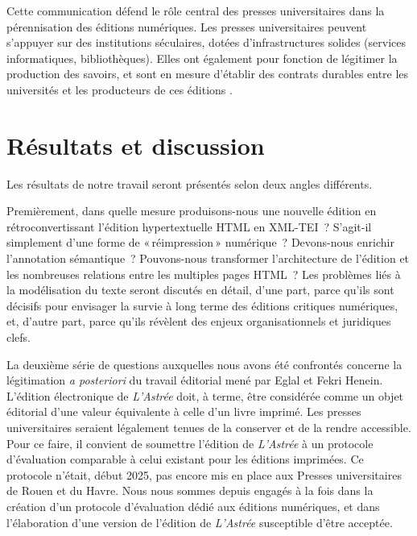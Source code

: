 \documentclass[final,fra]{anthology-ch} %
\begin{document}
Cette communication défend le rôle central des presses universitaires
dans la pérennisation des éditions numériques. Les presses universitaires
peuvent s'appuyer sur des institutions séculaires, dotées
d'infrastructures solides (services informatiques, bibliothèques). Elles
ont également pour fonction de légitimer la production des savoirs, et
sont en mesure d'établir des contrats durables entre les universités et
les producteurs de ces éditions \autocite{epron_iii_2018}.

\section{Résultats et discussion}\label{ruxe9sultats-et-discussion}

Les résultats de notre travail seront présentés selon deux angles
différents.

Premièrement, dans quelle mesure produisons-nous une nouvelle édition en
rétroconvertissant l'édition hypertextuelle HTML en XML-TEI~? S'agit-il
simplement d'une forme de «\,réimpression\,» numérique~? Devons-nous
enrichir l'annotation sémantique~? Pouvons-nous transformer
l'architecture de l'édition et les nombreuses relations entre les
multiples pages HTML~? Les problèmes liés à la modélisation du texte
seront discutés en détail, d'une part, parce qu'ils sont décisifs pour
envisager la survie à long terme des éditions critiques numériques, et,
d'autre part, parce qu'ils révèlent des enjeux organisationnels et
juridiques clefs.

La deuxième série de questions auxquelles nous avons été confrontés
concerne la légitimation \emph{a posteriori} du travail éditorial mené
par Eglal et Fekri Henein. L'édition électronique de \emph{L'Astrée}
doit, à terme, être considérée comme un objet éditorial d'une valeur
équivalente à celle d'un livre imprimé. Les presses universitaires
seraient légalement tenues de la conserver et de la rendre accessible.
Pour ce faire, il convient de soumettre l'édition de \emph{L'Astrée} à
un protocole d'évaluation comparable à celui existant pour les éditions
imprimées. Ce protocole n'était, début 2025, pas encore mis en place aux
Presses universitaires de Rouen et du Havre. Nous nous sommes depuis
engagés à la fois dans la création d'un protocole d'évaluation dédié aux
éditions numériques, et dans l'élaboration d'une version de l'édition de
\emph{L'Astrée} susceptible d'être acceptée.
\end{document}
